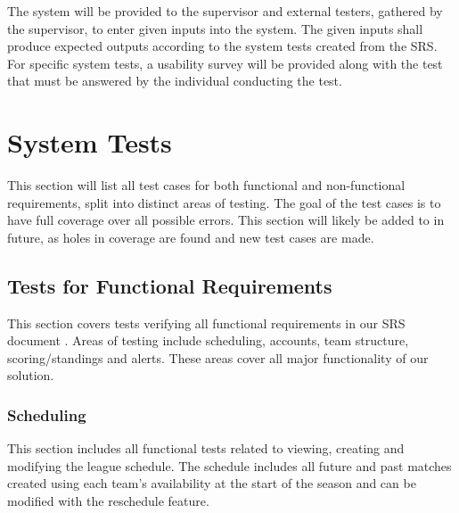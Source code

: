 \documentclass[12pt, titlepage]{article}
\begin{document}
The system will be provided to the supervisor and external testers, gathered by the supervisor,
to enter given inputs into the system. The given inputs shall produce expected outputs according to
the system tests created from the SRS. For specific system tests, a usability survey will be
provided along with the test that must be answered by the individual conducting the test.

\section{System Tests}

This section will list all test cases for both functional and non-functional
requirements, split into distinct areas of testing. The goal of the test cases
is to have full coverage over all possible errors. This section will likely be
added to in future, as holes in coverage are found and new test cases are
made.

\subsection{Tests for Functional Requirements}

This section covers tests verifying all functional requirements in our SRS
document \cite{SRS}. Areas of testing include scheduling, accounts, team
structure, scoring/standings and alerts. These areas cover all major
functionality of our solution.

\subsubsection{Scheduling}

This section includes all functional tests related to viewing, creating and
modifying the league schedule. The schedule includes all future and past
matches created using each team's availability at the start of the season and
can be modified with the reschedule feature.
\end{document}
